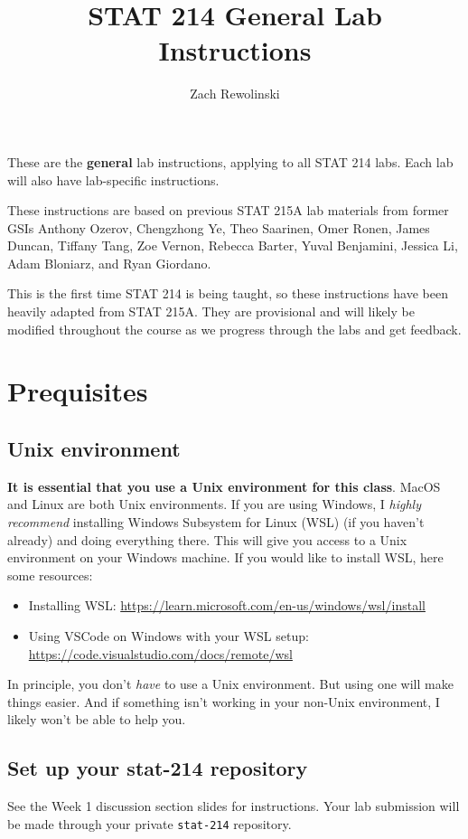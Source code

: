\documentclass[letterpaper,12pt]{article}
\title{STAT 214 General Lab Instructions\vspace{-1em}}
\author{Zach Rewolinski}
\begin{document}
\maketitle

These are the \textbf{general} lab instructions, applying to all STAT 214 labs. Each lab will also have lab-specific instructions.

\tableofcontents

These instructions are based on previous STAT 215A lab materials from former GSIs Anthony Ozerov, Chengzhong Ye, Theo Saarinen, Omer Ronen, James Duncan, Tiffany Tang, Zoe Vernon, Rebecca Barter, Yuval Benjamini, Jessica Li, Adam Bloniarz, and Ryan Giordano.

This is the first time STAT 214 is being taught, so these instructions have been heavily adapted from STAT 215A. They are provisional and will likely be modified throughout the course as we progress through the labs and get feedback.

\section{Prequisites}
\subsection{Unix environment}
\textbf{It is essential that you use a Unix environment for this class}. MacOS and Linux are both Unix environments. If you are using Windows, I \textit{highly recommend} installing Windows Subsystem for Linux (WSL) (if you haven't already) and doing everything there. This will give you access to a Unix environment on your Windows machine. If you would like to install WSL, here some resources:
\begin{itemize}
    \item Installing WSL: \url{https://learn.microsoft.com/en-us/windows/wsl/install}
    \item Using VSCode on Windows with your WSL setup: \url{https://code.visualstudio.com/docs/remote/wsl}
\end{itemize}
In principle, you don't \textit{have} to use a Unix environment. But using one will make things easier. And if something isn't working in your non-Unix environment, I likely won't be able to help you.
\subsection{Set up your stat-214 repository}
See the Week 1 discussion section slides for instructions. Your lab submission will be made through your private \texttt{stat-214} repository.
\end{document}
